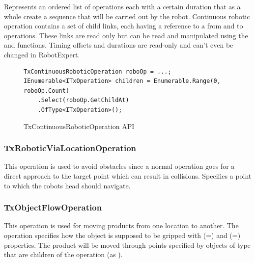 Represents an ordered list of operations each with a certain duration that as a whole create a sequence that will be carried out by the robot.
Continuous robotic operation contains a set of child links, each having a reference to a from and to operations.
These links are read only but can be read and manipulated using the  and  functions.
Timing offsets and durations are read-only and can't even be changed in RobotExpert.

\begin{figure}[H]
    \caption{TxContinuousRoboticOperation API}
    \centering
    \begin{verbatim}
TxContinuousRoboticOperation roboOp = ...;
IEnumerable<ITxOperation> children = Enumerable.Range(0, roboOp.Count)
    .Select(roboOp.GetChildAt)
    .OfType<ITxOperation>();
    \end{verbatim}
    \label{fig:CodeTxContinuousRoboticOperation}
\end{figure}

\subsubsection{TxRoboticViaLocationOperation}

This operation is used to avoid obstacles since a normal operation goes for a direct approach to the target point which can result in collisions.
Specifies a point to which the robots head should navigate.

\subsubsection{TxObjectFlowOperation}

This operation is used for moving products from one location to another.
The operation specifies how the object is supposed to be gripped with  (=) and  (=) properties.
The product will be moved through points specified by objects of type  that are children of the operation (as ).
